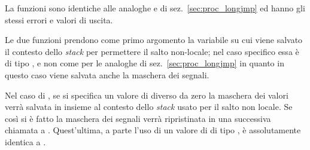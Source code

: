 \begin{funcproto}{
}

{La funzioni sono identiche alle analoghe  e  di
  sez.~\ref{sec:proc_longjmp} ed hanno gli stessi errori e valori di uscita.}
\end{funcproto}

Le due funzioni prendono come primo argomento la variabile su cui viene
salvato il contesto dello \textit{stack} per permettere il salto non-locale;
nel caso specifico essa è di tipo , e non 
come per le analoghe di sez.~\ref{sec:proc_longjmp} in quanto in questo caso
viene salvata anche la maschera dei segnali.

Nel caso di , se si specifica un valore di 
diverso da zero la maschera dei valori verrà salvata in  insieme al
contesto dello \textit{stack} usato per il salto non locale. Se così si è
fatto la maschera dei segnali verrà ripristinata in una successiva chiamata a
. Quest'ultima, a parte l'uso di un valore di  di
tipo , è assolutamente identica a .




